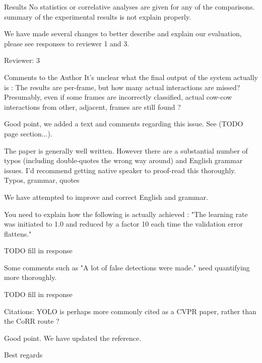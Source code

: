 \documentclass[10pt,a4paper]{letter}
\begin{document}
\begin{letter}{}
\begin{siderules}
Results No statistics or correlative analyses are given for any of the comparisons.
summary of the experimental results is not explain properly.
\end{siderules}

We have made several changes to better describe and explain our evaluation, please see responses to reviewer 1 and 3.

\begin{siderules}
Reviewer: 3

Comments to the Author
It's unclear what the final output of the system actually is : The results are per-frame, but how many actual interactions are missed? 
Presumably, even if some frames are incorrectly classified, actual cow-cow interactions from other, adjacent, frames are still found ?
\end{siderules}

Good point, we added a text and comments regarding this issue. See (TODO page section...).

\begin{siderules}
The paper is generally well written. However there are a substantial number of typos (including double-quotes the wrong way around) and English grammar issues. I'd recommend getting
native speaker to proof-read this thoroughly. Typos, grammar, quotes
\end{siderules}

We have attempted to improve and correct English and grammar.

\begin{siderules}
You need to explain how the following is actually achieved : "The learning rate was initiated to 1.0 and reduced by a factor 10 each time the validation 
error flattens."
\end{siderules}

TODO fill in response

\begin{siderules}
Some comments such as "A lot of false detections were made." need quantifying more thoroughly.
\end{siderules}

TODO fill in response

\begin{siderules}
Citations: YOLO is perhaps more commonly cited as a CVPR paper, rather than the CoRR route ?
\end{siderules}

Good point. We have updated the reference.


 
\closing{Best regards} 
\end{letter} 
\end{document}
